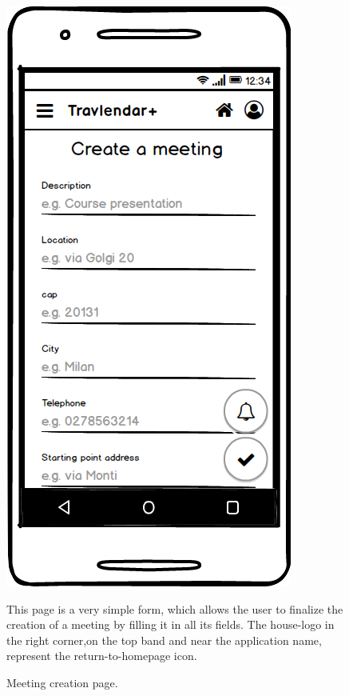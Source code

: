 	\begin{figure}
		\centering
		\includegraphics[width=0.6\linewidth]{mockups/CreateMeeting}
		\caption{Meeting creation page.}
		\label{fig:createmeeting}
		\begin{center}
			This page is a very simple form, which allows the user to finalize the creation of a meeting by filling it in all its fields. 
			The house-logo in the  right corner,on the top band and near the application name, represent the return-to-homepage icon. 
		\end{center}
	\end{figure}

